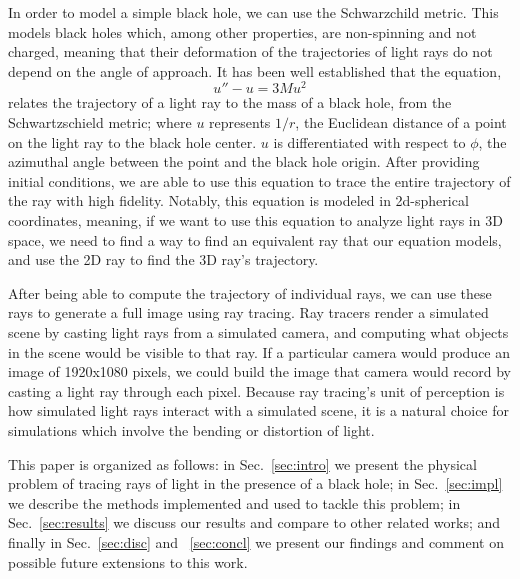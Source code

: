 In order to model a simple black hole, we can use the Schwarzchild metric.
This models black holes which, among other properties, are non-spinning and not charged,
meaning that their deformation of the trajectories of light rays do not depend on the angle of approach.
It has been well established \cite{gravitation-mtw} that the equation,
\begin{equation}
	u'' - u = 3 M u^2
\end{equation}
relates the trajectory of a light ray to the mass of a black hole, from the Schwartzschield metric;
where $u$ represents $1/r$, the Euclidean distance of a point on the light ray to the black hole center.
$u$ is differentiated with respect to $\phi$, the azimuthal angle between the point and the black hole origin.
After providing initial conditions, we are able to use this equation to trace the entire trajectory of the ray with high fidelity.
Notably, this equation is modeled in 2d-spherical coordinates, meaning, if we want to use this equation to analyze light rays in 3D space, we need to find a way to find an equivalent ray that our equation models, and use the 2D ray to find the 3D ray's trajectory.

After being able to compute the trajectory of individual rays, we can use these rays to generate a full image using ray tracing. Ray tracers render a simulated scene by casting light rays from a simulated camera, and computing what objects in the scene would be visible to that ray. If a particular camera would produce an image of 1920x1080 pixels, we could build the image that camera would record by casting a light ray through each pixel. Because ray tracing's unit of perception is how simulated light rays interact with a simulated scene, it is a natural choice for simulations which involve the bending or distortion of light.


This paper is organized as follows:
in Sec.~\ref{sec:intro} we present the physical problem of tracing rays of light in the presence of a black hole;
in Sec.~\ref{sec:impl} we describe the methods implemented and used to tackle this problem;
in Sec.~\ref{sec:results} we discuss our results and compare to other related works;
and finally in Sec.~\ref{sec:disc} and ~\ref{sec:concl} we present our findings and comment
on possible future extensions to this work.



